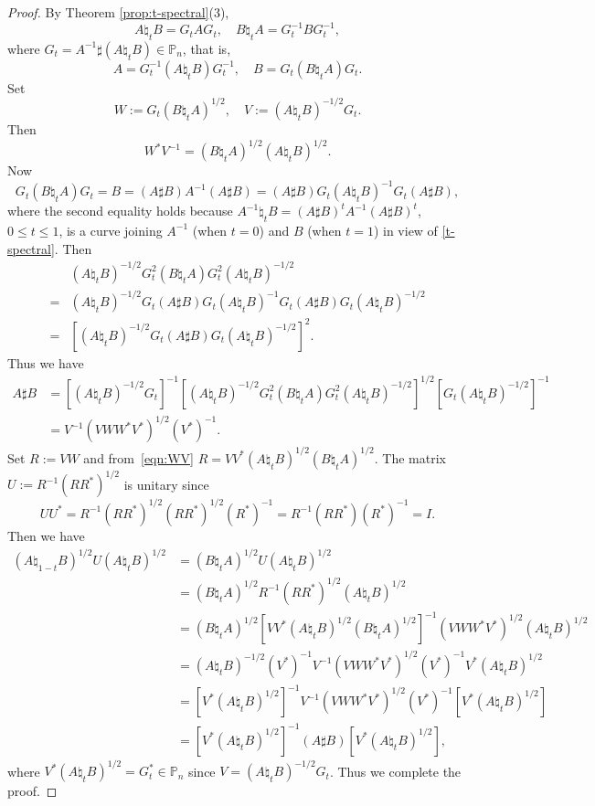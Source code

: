 \documentclass[12pt, reqno]{amsart}
\numberwithin{equation}{section}
\theoremstyle{definition}
\renewcommand{\le}{\leqslant}
\def\P{\mathbb P}
\begin{document}
\begin{proof}
By Theorem \ref{prop:t-spectral}(3), 
$$A\natural_t B = G_tAG_t, \quad B\natural_t A = G_t^{-1}BG_t^{-1},$$ where $G_t = A^{-1} \sharp (A\natural_t B)\in \P_n$, that is, $$A= G_t^{-1} (A\natural_t B )G_t^{-1},\quad B = G_t (B\natural_t A) G_t.$$
Set $$W := G_t (B\natural_t A)^{1/2},\quad V := (A\natural_t B)^{-1/2}G_t.$$
Then \begin{equation}\label{eqn:WV}
 	W^* V^{-1} = (B \natural_t A)^{1/2}(A\natural_t B)^{1/2}.
 \end{equation}
Now 
\[
G_t (B\natural_t A) G_t = B = (A\sharp B) A^{-1}(A\sharp B)  = (A\sharp B) G_t (A\natural_t B)^{-1} G_t(A\sharp B),
\]
where the second equality holds because $A^{-1}\natural_t B = (A\sharp B)^t A^{-1} (A\sharp B)^t$, $0\le t\le 1$, is a curve joining $A^{-1}$ (when $t=0$) and $B$ (when $t=1$) in view of \eqref{t-spectral}. Then
\[
\begin{split}
&(A\natural_t B)^{-1/2}G_t^2(B\natural_t A) G_t^2 (A\natural_t B)^{-1/2}
\\=& (A\natural_t B)^{-1/2}G_t(A\sharp B) G_t (A\natural_t B)^{-1} G_t(A\sharp B)G_t (A\natural_t B)^{-1/2}
\\
 = &\left[(A\natural_t B)^{-1/2}G_t(A\sharp B) G_t (A\natural_t B)^{-1/2}\right]^2.
\end{split}
\]
Thus we have 
\[
\begin{split}
A\sharp B &= \left[(A\natural_t B)^{-1/2}G_t\right]^{-1} \left[(A\natural_t B)^{-1/2}G_t^2(B\natural_t A) G_t^2 (A\natural_t B)^{-1/2}\right]^{1/2}\left[G_t (A\natural_t B)^{-1/2}\right]^{-1} \\
&= V^{-1}(V W W^* V^*)^{1/2} (V^*)^{-1}.
\end{split}
\]
Set $R := VW$ and from~\eqref{eqn:WV} $R = VV^*(A\natural_t B)^{1/2}(B\natural_t A)^{1/2}$. The matrix $U := R^{-1} (R R^*)^{1/2}$ is unitary since
\[
UU^* = R^{-1} (R R^*)^{1/2}  (R R^*)^{1/2} (R^*)^{-1} = R^{-1} (R R^*)(R^*)^{-1} = I.
\]
 Then we have
\[
\begin{split}
(A\natural_{1-t} B)^{1/2} U (A\natural_t B)^{1/2} &= (B\natural_t A)^{1/2} U (A\natural_t B)^{1/2} \\
&= (B\natural_t A)^{1/2}  R^{-1} (R R^*)^{1/2} (A\natural_t B)^{1/2}\\
&= (B\natural_t A)^{1/2}\left[VV^*(A\natural_t B)^{1/2}(B\natural_t A)^{1/2}\right]^{-1}(VWW^*V^*)^{1/2}(A\natural_t B)^{1/2}\\
&= (A\natural_t B)^{-1/2}(V^*)^{-1}V^{-1}(VWW^*V^*)^{1/2}(V^*)^{-1}V^*(A\natural_t B)^{1/2}\\
&= \left[V^*(A\natural_t B)^{1/2}\right]^{-1}V^{-1}(VWW^*V^*)^{1/2}(V^*)^{-1}\left[V^*(A\natural_t B)^{1/2}\right]\\
&=  \left[V^*(A\natural_t B)^{1/2}\right]^{-1}(A\sharp B)\left[V^*(A\natural_t B)^{1/2}\right],
\end{split}
\]
where $V^*(A\natural_t B)^{1/2} = G_t^*\in \P_n$ since $V = (A\natural_t B)^{-1/2}G_t$. Thus we complete the proof.
\end{proof}
\end{document}
